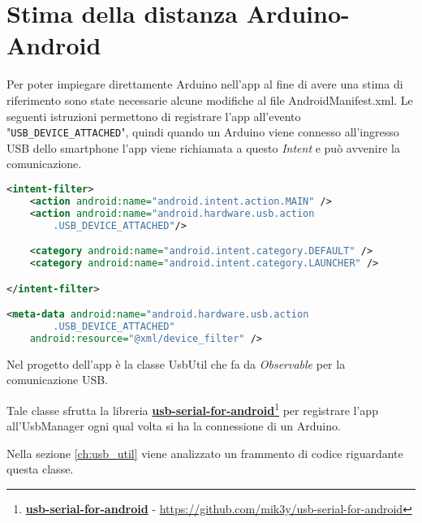 \section{Stima della distanza Arduino-Android}
Per poter impiegare direttamente Arduino nell'app al fine di avere una stima di riferimento sono state necessarie alcune modifiche al file AndroidManifest.xml. Le seguenti istruzioni permettono di registrare l'app all'evento "\texttt{USB\_DEVICE\_ATTACHED}", quindi quando un Arduino viene connesso all'ingresso USB dello smartphone l'app viene richiamata a questo \textit{Intent} e può avvenire la comunicazione.

\begin{lstlisting}[language=XML]
<intent-filter>
	<action android:name="android.intent.action.MAIN" />
	<action android:name="android.hardware.usb.action
		.USB_DEVICE_ATTACHED"/>

	<category android:name="android.intent.category.DEFAULT" />
	<category android:name="android.intent.category.LAUNCHER" />

</intent-filter>

<meta-data android:name="android.hardware.usb.action
		.USB_DEVICE_ATTACHED" 
	android:resource="@xml/device_filter" />
\end{lstlisting}

Nel progetto dell'app è la classe UsbUtil che fa da \textit{Observable} per la comunicazione USB. 


Tale classe sfrutta la libreria \href{https://atom.io/}{\textbf{usb-serial-for-android}}\footnote{\href{https://github.com/mik3y/usb-serial-for-android}{\textbf{usb-serial-for-android}} - \url{https://github.com/mik3y/usb-serial-for-android}} per registrare l'app all'UsbManager ogni qual volta si ha la connessione di un Arduino.

Nella sezione \ref{ch:usb_util} viene analizzato un frammento di codice riguardante questa classe.